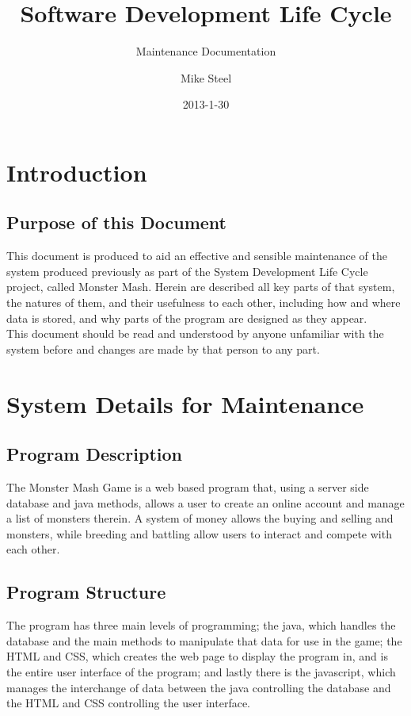 \documentclass{project}
\begin{document}
\title{Software Development Life Cycle}
\subtitle{Maintenance Documentation}
\author{Mike Steel}
\date{2013-1-30}
\maketitle
\tableofcontents
\newpage
\section{Introduction}
\subsection{Purpose of this Document}
This document is produced to aid an effective and sensible maintenance of the system produced previously as part of the System Development Life Cycle project, called Monster Mash. Herein are described all key parts of that system, the natures of them, and their usefulness to each other, including how and where data is stored, and why parts of the program are designed as they appear. \\
This document should be read and understood by anyone unfamiliar with the system before and changes are made by that person to any part.

\section{System Details for Maintenance}
\subsection{Program Description}
The Monster Mash Game is a web based program that, using a server side database and java methods, allows a user to create an online account and manage a list of monsters therein. A system of money allows the buying and selling and monsters, while breeding and battling allow users to interact and compete with each other. 

\subsection{Program Structure}
The program has three main levels of programming; the java, which handles the database and the main methods to manipulate that data for use in the game; the HTML and CSS, which creates the web page to display the program in, and is the entire user interface of the program; and lastly there is the javascript, which manages the interchange of data between the java controlling the database and the HTML and CSS controlling the user interface.
\end{document}
